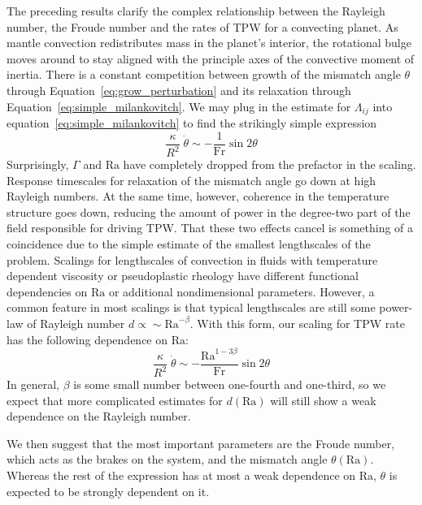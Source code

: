 \documentclass[extra,mreferee]{gji}
\begin{document}
The preceding results clarify the complex relationship between the Rayleigh number, the Froude number and the rates of TPW for a convecting planet.
As mantle convection redistributes mass in the planet's interior, the rotational bulge moves around to stay aligned with the principle axes of the convective moment of inertia. 
There is a constant competition between growth of the mismatch angle $\theta$ through 
Equation~\eqref{eq:grow_perturbation} and its relaxation through Equation~\eqref{eq:simple_milankovitch}.
We may plug in the estimate for $\Lambda_{ij}$ into equation~\eqref{eq:simple_milankovitch} to find the strikingly simple expression
\begin{equation}
\frac{\kappa}{R^2} \; \dot{\theta} \sim -\frac{1}{\mathrm{Fr}} \sin{2 \theta}
\label{eq:simplest_milankovitch}
\end{equation}
Surprisingly, $\Gamma$ and $\mathrm{Ra}$ have completely dropped from the prefactor in the scaling. 
Response timescales for relaxation of the mismatch angle go down at high Rayleigh numbers.
At the same time, however, coherence in the temperature structure goes down, reducing the amount of power in the degree-two part of the field responsible for driving TPW.
That these two effects cancel is something of a coincidence due to the simple estimate of the smallest lengthscales of the problem.
Scalings for lengthscales of convection in fluids with temperature dependent viscosity \citep[e.g.][]{solomatov1995scaling} or pseudoplastic rheology \citep[e.g.][]{korenaga2010scaling} have different functional dependencies on $\mathrm{Ra}$ or additional nondimensional parameters.
However, a common feature in most scalings is that typical lengthscales are still some power-law of Rayleigh number $d \propto \sim \mathrm{Ra}^{-\beta}$.
With this form, our scaling for TPW rate has the following dependence on $\mathrm{Ra}$:
\begin{equation}
\frac{\kappa}{R^2} \; \dot{\theta} \sim -\frac{\mathrm{Ra}^{1-3\beta}}{\mathrm{Fr}} \sin{2 \theta}
\label{eq:simplest_milankovitch_defer_scaling}
\end{equation}
In general, $\beta$ is some small number between one-fourth and one-third, so we expect that more complicated estimates for $d(\mathrm{Ra})$ will still show a weak dependence on the Rayleigh number.

We then suggest that the most important parameters are the Froude number, which acts as the brakes on the system, and the mismatch angle $\theta(\mathrm{Ra})$.
Whereas the rest of the expression has at most a weak dependence on $\mathrm{Ra}$, $\theta$ is expected to be strongly dependent on it.
\end{document}
